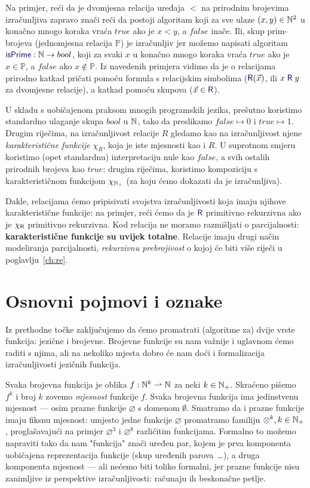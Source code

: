 Na primjer, reći da je dvomjesna relacija uređaja $<$ na prirodnim brojevima iz\-ra\-čun\-lji\-va zapravo znači reći da postoji algoritam koji za sve ulaze $(x,y)\in{\mathbb N}^2$ u konačno mnogo koraka vraća $\mathit{true}$ ako je $x<y$, a $\mathit{false}$ inače. Ili, skup prim-brojeva (jednomjesna relacija $\mathbb P$) je izračunljiv jer možemo napisati algoritam $\f{isPrime}:\N\to bool$, koji za svaki $x$ u konačno mnogo koraka vraća $\mathit{true}$ ako je $x\in\mathbb P$, a $\mathit{false}$ ako $x\notin\mathbb P$. Iz navedenih primjera vidimo da je o relacijama prirodno katkad pričati pomoću formula s relacijskim simbolima ($\f{R}(\vec x)$, ili $x\mathrel{\f R}y$ za dvomjesne relacije), a katkad pomoću skupova ($\vec x\in\f{R}$).

U skladu s uobičajenom praksom mnogih programskih jezika, prešutno koristimo standardno ulaganje skupa $bool$ u ${\mathbb N}$, tako da preslikamo $\mathit{false}\mapsto 0$ i $\mathit{true}\mapsto 1$. Drugim riječima, na izračunljivost relacije $R$ gledamo kao na izračunljivost njene \emph{karakteristične funkcije} $\chi_R$, koja je iste mjesnosti kao i $R$. U suprotnom smjeru koristimo (opet standardnu) interpretaciju nule kao $\mathit{false}$, a svih ostalih prirodnih brojeva kao $\mathit{true}$: drugim riječima, koristimo kompoziciju s karakterističnom funkcijom $\chi_{{\mathbb N}_+}$ (za koju ćemo dokazati da je izračunljiva).

Dakle, relacijama ćemo pripisivati svojstva izračunljivosti koja imaju njihove karakteristične funkcije: na primjer, reći ćemo da je $\f{R}$ primitivno rekurzivna ako je $\chi_{\f{R}}$ primitivno rekurzivna. Kod relacija ne moramo razmišljati o parcijalnosti: \textbf{karakteristične funkcije su uvijek totalne}. Relacije imaju drugi način modeliranja parcijalnosti, \emph{rekurzivnu prebrojivost} o kojoj će biti više riječi u poglavlju~\ref{ch:re}.

\section{Osnovni pojmovi i oznake}

Iz prethodne točke zaključujemo da ćemo promatrati (algoritme za) dvije vrste funkcija: jezične i brojevne. Brojevne funkcije su nam važnije i uglavnom ćemo raditi s njima, ali na nekoliko mjesta dobro će nam doći i formalizacija izračunljivosti jezičnih funkcija.

Svaka brojevna funkcija je oblika $f:{\mathbb N}^k\rightharpoonup{\mathbb N}$ za neki $k\in{\mathbb N}_+$. Skraćeno pišemo $f^k$ i broj $k$ zovemo \emph{mjesnost} funkcije $f$. Svaka brojevna funkcija ima jedinstvenu mjesnost --- osim prazne funkcije $\varnothing$ s domenom $\emptyset$. Smatramo da i prazne funkcije imaju fiksnu mjesnost: umjesto jedne funkcije $\varnothing$ promatramo familiju $\varnothing^k,k\in\N_+$, proglašavajući na primjer $\varnothing^3$ i $\varnothing^8$ različitim funkcijama. Formalno to možemo napraviti tako da nam "funkcija" znači uređen par, kojem je prva komponenta uobičajena reprezentacija funkcije (skup uređenih parova~\ldots), a druga komponenta mjesnost --- ali nećemo biti toliko formalni, jer prazne funkcije nisu zanimljive iz perspektive izračunljivosti: računaju ih beskonačne petlje.

